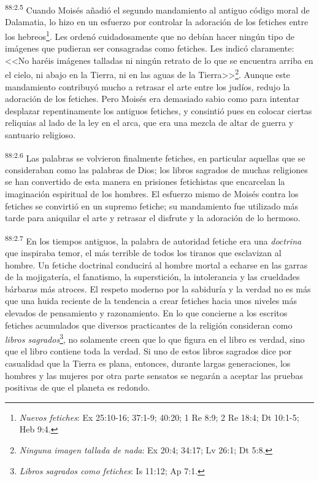 \par
\textsuperscript{88:2.5} Cuando Moisés añadió el segundo mandamiento al antiguo código moral de Dalamatia, lo hizo en un esfuerzo por controlar la adoración de los fetiches entre los hebreos\footnote{\textit{Nuevos fetiches}: Ex 25:10-16; 37:1-9; 40:20; 1 Re 8:9; 2 Re 18:4; Dt 10:1-5; Heb 9:4.}. Les ordenó cuidadosamente que no debían hacer ningún tipo de imágenes que pudieran ser consagradas como fetiches. Les indicó claramente: <<No haréis imágenes talladas ni ningún retrato de lo que se encuentra arriba en el cielo, ni abajo en la Tierra, ni en las aguas de la Tierra>>\footnote{\textit{Ninguna imagen tallada de nada}: Ex 20:4; 34:17; Lv 26:1; Dt 5:8.}. Aunque este mandamiento contribuyó mucho a retrasar el arte entre los judíos, redujo la adoración de los fetiches. Pero Moisés era demasiado sabio como para intentar desplazar repentinamente los antiguos fetiches, y consintió pues en colocar ciertas reliquias al lado de la ley en el arca, que era una mezcla de altar de guerra y santuario religioso.

\par
\textsuperscript{88:2.6} Las palabras se volvieron finalmente fetiches, en particular aquellas que se consideraban como las palabras de Dios; los libros sagrados de muchas religiones se han convertido de esta manera en prisiones fetichistas que encarcelan la imaginación espiritual de los hombres. El esfuerzo mismo de Moisés contra los fetiches se convirtió en un supremo fetiche; su mandamiento fue utilizado más tarde para aniquilar el arte y retrasar el disfrute y la adoración de lo hermoso.

\par
\textsuperscript{88:2.7} En los tiempos antiguos, la palabra de autoridad fetiche era una \textit{doctrina} que inspiraba temor, el más terrible de todos los tiranos que esclavizan al hombre. Un fetiche doctrinal conducirá al hombre mortal a echarse en las garras de la mojigatería, el fanatismo, la superstición, la intolerancia y las crueldades bárbaras más atroces. El respeto moderno por la sabiduría y la verdad no es más que una huida reciente de la tendencia a crear fetiches hacia unos niveles más elevados de pensamiento y razonamiento. En lo que concierne a los escritos fetiches acumulados que diversos practicantes de la religión consideran como \textit{libros sagrados}\footnote{\textit{Libros sagrados como fetiches}: Is 11:12; Ap 7:1.}, no solamente creen que lo que figura en el libro es verdad, sino que el libro contiene toda la verdad. Si uno de estos libros sagrados dice por casualidad que la Tierra es plana, entonces, durante largas generaciones, los hombres y las mujeres por otra parte sensatos se negarán a aceptar las pruebas positivas de que el planeta es redondo.

